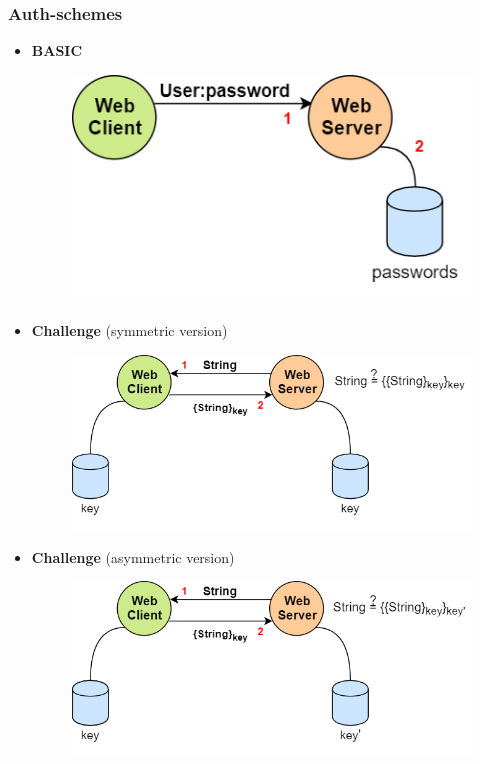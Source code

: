 \subsubsection{Auth-schemes}
\begin{itemize}
\item{\textbf{BASIC}\\
\begin{figure}[h]
\centering
\includegraphics[scale=0.5]{Images/HTTP/basic}
\end{figure}
}
\item{\textbf{Challenge} (symmetric version)\\
\begin{figure}[h]
\centering
\includegraphics[scale=0.5]{Images/HTTP/challenge_sym}
\end{figure}
}
\item{\textbf{Challenge} (asymmetric version)\\
\begin{figure}[h]
\centering
\includegraphics[scale=0.5]{Images/HTTP/challenge_asym}
\end{figure}
}
\end{itemize}
